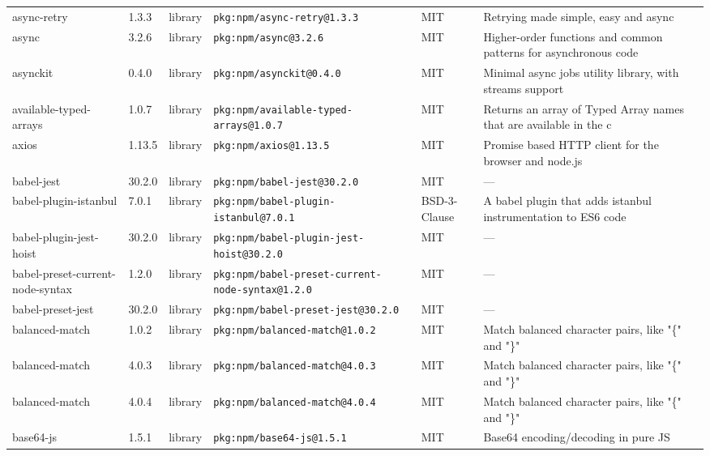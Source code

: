 \documentclass[11pt,a4paper]{article}
\begin{document}
\begin{longtable}{|p{4cm}|p{2cm}|p{1.6cm}|p{5cm}|p{1.5cm}|p{3.5cm}|}
\raggedright async-retry & 1.3.3 & library & \small\texttt{pkg:npm/async-retry@1.3.3} & MIT & \small Retrying made simple, easy and async \\
\raggedright async & 3.2.6 & library & \small\texttt{pkg:npm/async@3.2.6} & MIT & \small Higher-order functions and common patterns for asynchronous code \\
\raggedright asynckit & 0.4.0 & library & \small\texttt{pkg:npm/asynckit@0.4.0} & MIT & \small Minimal async jobs utility library, with streams support \\
\raggedright available-typed-arrays & 1.0.7 & library & \small\texttt{pkg:npm/available-typed-arrays@1.0.7} & MIT & \small Returns an array of Typed Array names that are available in the c \\
\raggedright axios & 1.13.5 & library & \small\texttt{pkg:npm/axios@1.13.5} & MIT & \small Promise based HTTP client for the browser and node.js \\
\raggedright babel-jest & 30.2.0 & library & \small\texttt{pkg:npm/babel-jest@30.2.0} & MIT & \small — \\
\raggedright babel-plugin-istanbul & 7.0.1 & library & \small\texttt{pkg:npm/babel-plugin-istanbul@7.0.1} & BSD-3-Clause & \small A babel plugin that adds istanbul instrumentation to ES6 code \\
\raggedright babel-plugin-jest-hoist & 30.2.0 & library & \small\texttt{pkg:npm/babel-plugin-jest-hoist@30.2.0} & MIT & \small — \\
\raggedright babel-preset-current-node-syntax & 1.2.0 & library & \small\texttt{pkg:npm/babel-preset-current-node-syntax@1.2.0} & MIT & \small — \\
\raggedright babel-preset-jest & 30.2.0 & library & \small\texttt{pkg:npm/babel-preset-jest@30.2.0} & MIT & \small — \\
\raggedright balanced-match & 1.0.2 & library & \small\texttt{pkg:npm/balanced-match@1.0.2} & MIT & \small Match balanced character pairs, like "\{" and "\}" \\
\raggedright balanced-match & 4.0.3 & library & \small\texttt{pkg:npm/balanced-match@4.0.3} & MIT & \small Match balanced character pairs, like "\{" and "\}" \\
\raggedright balanced-match & 4.0.4 & library & \small\texttt{pkg:npm/balanced-match@4.0.4} & MIT & \small Match balanced character pairs, like "\{" and "\}" \\
\raggedright base64-js & 1.5.1 & library & \small\texttt{pkg:npm/base64-js@1.5.1} & MIT & \small Base64 encoding/decoding in pure JS \\

\end{longtable}
\end{document}
